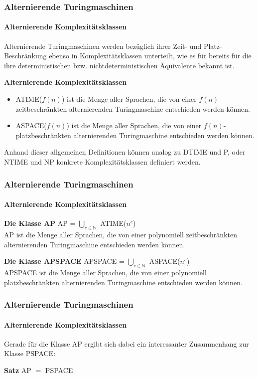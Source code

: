 \begin{frame}
    \frametitle{Alternierende Turingmaschinen}
    \framesubtitle{Alternierende Komplexitätsklassen}
    Alternierende Turingmaschinen werden bezüglich ihrer Zeit- und Platz-Beschränkung ebenso in Komplexitätsklassen unterteilt, wie 
    es für bereits für die ihre deterministischen bzw. nichtdeterministischen Äquivalente bekannt ist.
    \begin{block}{\textbf{Alternierende Komplexitätsklassen}}
        \begin{itemize}
            \item ATIME($f(n)$) ist die Menge aller Sprachen, die von einer $f(n)$-zeitbeschränkten alternierenden Turingmaschine entschieden werden können.
            \item ASPACE($f(n)$) ist die Menge aller Sprachen, die von einer $f(n)$-platzbeschränkten alternierenden Turingmaschine entschieden werden können. 
        \end{itemize}
    \end{block}
    Anhand dieser allgemeinen Definitionen können analog zu DTIME und P, oder NTIME und NP konkrete Komplexitätsklassen definiert werden.
\end{frame}

\begin{frame}
    \frametitle{Alternierende Turingmaschinen}
    \framesubtitle{Alternierende Komplexitätsklassen}
    
    \begin{block}{\textbf{Die Klasse AP}}
        AP = $\bigcup_{c \in \mathbb{N}}$ ATIME($n^c$) \\
        AP ist die Menge aller Sprachen, die von einer polynomiell zeitbeschränkten alternierenden Turingmaschine entschieden werden können.
    \end{block}

    \begin{block}{\textbf{Die Klasse APSPACE}}
        APSPACE = $\bigcup_{c \in \mathbb{N}}$ ASPACE($n^c$) \\
        APSPACE ist die Menge aller Sprachen, die von einer polynomiell platzbeschränkten alternierenden Turingmaschine entschieden werden können.
    \end{block}

\end{frame}


\begin{frame}
    \frametitle{Alternierende Turingmaschinen}
    \framesubtitle{Alternierende Komplexitätsklassen}
    
    Gerade für die Klasse AP ergibt sich dabei ein interessanter Zusammenhang zur Klasse PSPACE:

    \begin{block}{\textbf{Satz}}
        AP $=$ PSPACE
    \end{block}



\end{frame}


